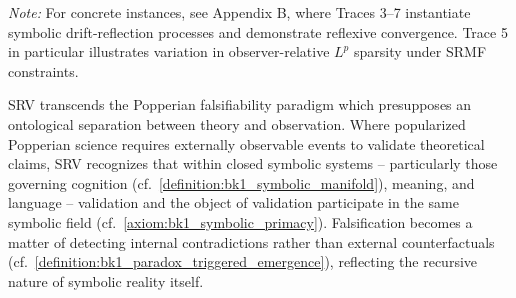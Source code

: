 \begin{definition}
\medskip\noindent\textit{Note:} For concrete instances, see Appendix B, where Traces 3--7 instantiate symbolic drift-reflection processes and demonstrate reflexive convergence. Trace 5 in particular illustrates variation in observer-relative $L^p$ sparsity under SRMF constraints.
\end{definition}
\begin{remark}
\label{remark:bk7_unnamed_remark_04}
SRV transcends the Popperian falsifiability paradigm which presupposes an ontological separation between theory and observation. Where popularized Popperian science requires externally observable events to validate theoretical claims, SRV recognizes that within closed symbolic systems -- particularly those governing cognition (cf.~\ref{definition:bk1_symbolic_manifold}), meaning, and language -- validation and the object of validation participate in the same symbolic field (cf.~\ref{axiom:bk1_symbolic_primacy}). Falsification becomes a matter of detecting internal contradictions rather than external counterfactuals (cf.~\ref{definition:bk1_paradox_triggered_emergence}), reflecting the recursive nature of symbolic reality itself.
\end{remark}
